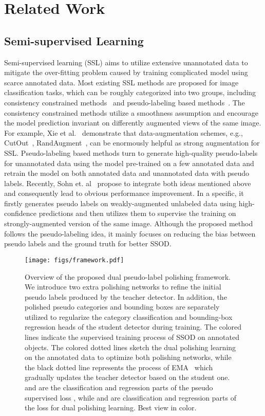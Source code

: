 \documentclass[letterpaper]{article} \usepackage{aaai23}  \usepackage{times}  \usepackage{helvet}  \usepackage{courier}  \usepackage[hyphens]{url}  \usepackage{graphicx} \urlstyle{rm} \def\UrlFont{\rm}  \usepackage{natbib}  \usepackage{caption} \frenchspacing  \setlength{\pdfpagewidth}{8.5in}  \setlength{\pdfpageheight}{11in}  \usepackage{algorithm}
\begin{document}
\section{Related Work}
\subsection{Semi-supervised Learning}
Semi-supervised learning (SSL) aims to utilize extensive unannotated data to mitigate the over-fitting problem caused by training complicated model using scarce annotated data. Most existing SSL methods are proposed for image classification tasks, which can be roughly categorized into two groups, including consistency constrained methods~\cite{berthelot2019mixmatch,miyato2018virtual,xie2020unsupervised,sajjadi2016regularization,tarvainen2017mean,berthelot2019remixmatch} and pseudo-labeling based methods~\cite{lee2013pseudo,xie2020self,zhai2019s4l,bachman2014learning,arazo2020pseudo,iscen2019label}. The consistency constrained methods utilize a smoothness assumption and encourage the model prediction invariant on differently augmented views of the same image. For example, Xie et al.~\cite{xie2020unsupervised} demonstrate that data-augmentation schemes, e.g., CutOut~\cite{devries2017improved}, RandAugment~\cite{cubuk2020randaugment}, 
can be enormously helpful as strong augmentation for SSL. Pseudo-labeling based methods turn to generate high-quality pseudo-labels for unannotated data using the model pre-trained on a few annotated data and retrain the model on both annotated data and unannotated data with pseudo labels. 
Recently, Sohn et. al~\cite{sohn2020fixmatch} propose to 
integrate both ideas mentioned above and consequently lead to obvious performance improvement. In a specific, it firstly generates pseudo labels on weakly-augmented unlabeled data using high-confidence predictions and then utilizes them to supervise the training on strongly-augmented version of the same image. Although the proposed method follows the pseudo-labeling idea, it mainly focuses on reducing the bias between pseudo labels and the ground truth for better SSOD.

\begin{figure*}[h]
\centering
\texttt{[image: figs/framework.pdf]}
\caption{Overview of the proposed dual pseudo-label polishing framework. 
We introduce two extra polishing networks to refine the initial pseudo labels produced by the teacher detector. 
In addition, the polished pseudo categories and bounding boxes are separately utilized to regularize the category classification and bounding-box regression heads of the student detector during training. The colored lines indicate the supervised training process of SSOD on annotated objects. The colored dotted lines sketch the dual polishing learning on the annotated data to optimize both polishing networks, while the black dotted line represents the process of EMA~\cite{tarvainen2017mean} which gradually updates the teacher detector based on the student one.  and  are the classification and regression parts of the pseudo supervised loss , while  and  are classification and regression parts of the loss  for dual polishing learning. Best view in color.
}
\label{fig:framework}
\end{figure*}
\end{document}
